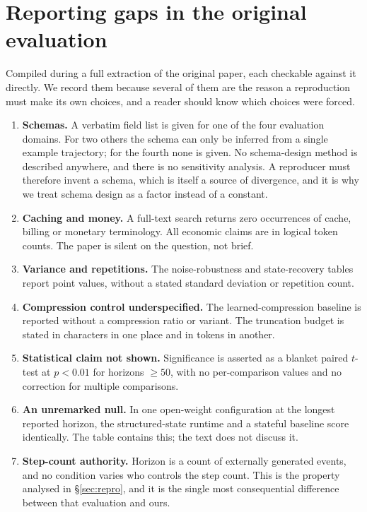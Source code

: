 \section{Reporting gaps in the original evaluation}
\label{sec:gaps}

Compiled during a full extraction of the original paper, each checkable
against it directly\origin. We record them because several of them are the
reason a reproduction must make its own choices, and a reader should know
which choices were forced.

\begin{enumerate}
\item \textbf{Schemas.} A verbatim field list is given for one of the four
      evaluation domains. For two others the schema can only be inferred
      from a single example trajectory; for the fourth none is given. No
      schema-design method is described anywhere, and there is no
      sensitivity analysis. A reproducer must therefore invent a schema,
      which is itself a source of divergence, and it is why we treat schema
      design as a factor instead of a constant.

\item \textbf{Caching and money.} A full-text search returns zero
      occurrences of cache, billing or monetary terminology. All economic
      claims are in logical token counts. The paper is silent on the
      question, not brief.

\item \textbf{Variance and repetitions.} The noise-robustness and
      state-recovery tables report point values, without a stated standard
      deviation or repetition count.

\item \textbf{Compression control underspecified.} The learned-compression
      baseline is reported without a compression ratio or variant. The
      truncation budget is stated in characters in one place and in tokens
      in another.

\item \textbf{Statistical claim not shown.} Significance is asserted as a
      blanket paired $t$-test at $p<0.01$ for horizons $\ge 50$, with no
      per-comparison values and no correction for multiple comparisons.

\item \textbf{An unremarked null.} In one open-weight configuration at the
      longest reported horizon, the structured-state runtime and a stateful
      baseline score identically. The table contains this; the text does not
      discuss it.

\item \textbf{Step-count authority.} Horizon is a count of externally
      generated events, and no condition varies who controls the step count.
      This is the property analysed in \S\ref{sec:repro}, and it is the
      single most consequential difference between that evaluation and ours.
\end{enumerate}
